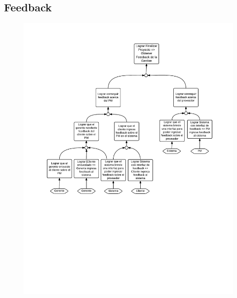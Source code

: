 \subsection{Feedback}
\begin{figure}[H]
\includegraphics[width=\textwidth, clip=true, trim=15pt 0pt 15pt 0pt]{imagenes/objetivos/objetivos17.pdf}
\end{figure}
